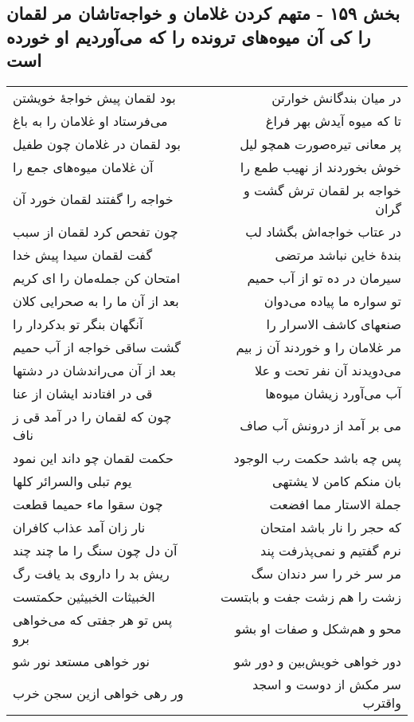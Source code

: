 \begin{center}
\section*{بخش ۱۵۹ - متهم کردن غلامان و خواجه‌تاشان مر لقمان را کی آن میوه‌های ترونده را که می‌آوردیم او خورده است}
\label{sec:sh159}
\begin{longtable}{l p{0.5cm} r}
بود لقمان پیش خواجهٔ خویشتن
&&
در میان بندگانش خوارتن
\\
می‌فرستاد او غلامان را به باغ
&&
تا که میوه آیدش بهر فراغ
\\
بود لقمان در غلامان چون طفیل
&&
پر معانی تیره‌صورت همچو لیل
\\
آن غلامان میوه‌های جمع را
&&
خوش بخوردند از نهیب طمع را
\\
خواجه را گفتند لقمان خورد آن
&&
خواجه بر لقمان ترش گشت و گران
\\
چون تفحص کرد لقمان از سبب
&&
در عتاب خواجه‌اش بگشاد لب
\\
گفت لقمان سیدا پیش خدا
&&
بندهٔ خاین نباشد مرتضی
\\
امتحان کن جمله‌مان را ای کریم
&&
سیرمان در ده تو از آب حمیم
\\
بعد از آن ما را به صحرایی کلان
&&
تو سواره ما پیاده می‌دوان
\\
آنگهان بنگر تو بدکردار را
&&
صنعهای کاشف الاسرار را
\\
گشت ساقی خواجه از آب حمیم
&&
مر غلامان را و خوردند آن ز بیم
\\
بعد از آن می‌راندشان در دشتها
&&
می‌دویدند آن نفر تحت و علا
\\
قی در افتادند ایشان از عنا
&&
آب می‌آورد زیشان میوه‌ها
\\
چون که لقمان را در آمد قی ز ناف
&&
می بر آمد از درونش آب صاف
\\
حکمت لقمان چو داند این نمود
&&
پس چه باشد حکمت رب الوجود
\\
یوم تبلی والسرائر کلها
&&
بان منکم کامن لا یشتهی
\\
چون سقوا ماء حمیما قطعت
&&
جملة الاستار مما افضعت
\\
نار زان آمد عذاب کافران
&&
که حجر را نار باشد امتحان
\\
آن دل چون سنگ را ما چند چند
&&
نرم گفتیم و نمی‌پذرفت پند
\\
ریش بد را داروی بد یافت رگ
&&
مر سر خر را سر دندان سگ
\\
الخبیثات الخبیثین حکمتست
&&
زشت را هم زشت جفت و بابتست
\\
پس تو هر جفتی که می‌خواهی برو
&&
محو و هم‌شکل و صفات او بشو
\\
نور خواهی مستعد نور شو
&&
دور خواهی خویش‌بین و دور شو
\\
ور رهی خواهی ازین سجن خرب
&&
سر مکش از دوست و اسجد واقترب
\\
\end{longtable}
\end{center}
